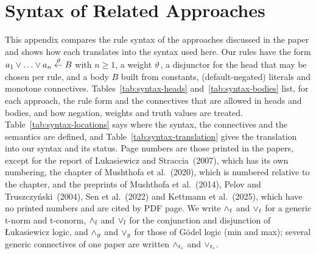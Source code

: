 \begingroup\color{darkorange}
\onecolumn
\section*{Syntax of Related Approaches}
\label{app:syntax}

This appendix compares the rule syntax of the approaches discussed in the paper and shows how each translates into the syntax used here.
Our rules have the form $a_1\flpor\dots\flpor a_n\flpif{\flpweight}B$ with $n\geq 1$, a weight $\vartheta$, a disjunctor for the head that may be chosen per rule, and a body $B$ built from constants, (default-negated) literals and monotone connectives.
Tables~\ref{tab:syntax-heads} and~\ref{tab:syntax-bodies} list, for each approach, the rule form and the connectives that are allowed in heads and bodies, and how negation, weights and truth values are treated.
Table~\ref{tab:syntax-locations} says where the syntax, the connectives and the semantics are defined, and Table~\ref{tab:syntax-translation} gives the translation into our syntax and its status.
Page numbers are those printed in the papers, except for the report of Lukasiewicz and Straccia~(2007), which has its own numbering, the chapter of Mushthofa et al.~(2020), which is numbered relative to the chapter, and the preprints of Mushthofa et al.~(2014), Pelov and Truszczy\'nski~(2004), Sen et al.~(2022) and Kettmann et al.~(2025), which have no printed numbers and are cited by PDF page.
We write $\land_t$ and $\lor_t$ for a generic t-norm and t-conorm, $\land_l$ and $\lor_l$ for the conjunction and disjunction of Łukasiewicz logic, and $\land_g$ and $\lor_g$ for those of Gödel logic (min and max); several generic connectives of one paper are written $\land_{t_i}$ and $\lor_{t_i}$.

